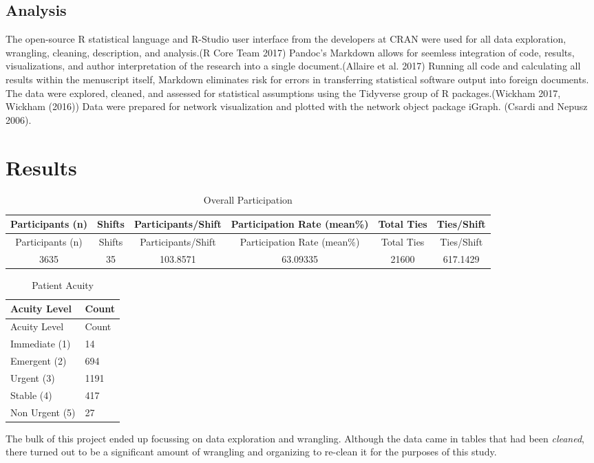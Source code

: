 \documentclass[]{elsarticle} %
\begin{document}
\subsection{Analysis}\label{analysis}

The open-source R statistical language and R-Studio user interface from
the developers at CRAN were used for all data exploration, wrangling,
cleaning, description, and analysis.(R Core Team 2017) Pandoc's Markdown
allows for seemless integration of code, results, visualizations, and
author interpretation of the research into a single document.(Allaire et
al. 2017) Running all code and calculating all results within the
menuscript itself, Markdown eliminates risk for errors in transferring
statistical software output into foreign documents. The data were
explored, cleaned, and assessed for statistical assumptions using the
Tidyverse group of R packages.(Wickham 2017, Wickham (2016)) Data were
prepared for network visualization and plotted with the network object
package iGraph. (Csardi and Nepusz 2006).

\section{Results}\label{results}

\begin{longtable}[]{@{}cccccc@{}}
\caption{Overall Participation}\tabularnewline
\toprule
Participants (n) & Shifts & Participants/Shift & Participation Rate
(mean\%) & Total Ties & Ties/Shift\tabularnewline
\midrule
\endfirsthead
\toprule
Participants (n) & Shifts & Participants/Shift & Participation Rate
(mean\%) & Total Ties & Ties/Shift\tabularnewline
\midrule
\endhead
3635 & 35 & 103.8571 & 63.09335 & 21600 & 617.1429\tabularnewline
\bottomrule
\end{longtable}

\begin{longtable}[]{@{}ll@{}}
\caption{Patient Acuity}\tabularnewline
\toprule
Acuity Level & Count\tabularnewline
\midrule
\endfirsthead
\toprule
Acuity Level & Count\tabularnewline
\midrule
\endhead
Immediate (1) & 14\tabularnewline
Emergent (2) & 694\tabularnewline
Urgent (3) & 1191\tabularnewline
Stable (4) & 417\tabularnewline
Non Urgent (5) & 27\tabularnewline
\bottomrule
\end{longtable}

The bulk of this project ended up focussing on data exploration and
wrangling. Although the data came in tables that had been
\emph{cleaned}, there turned out to be a significant amount of wrangling
and organizing to re-clean it for the purposes of this study.
\end{document}
